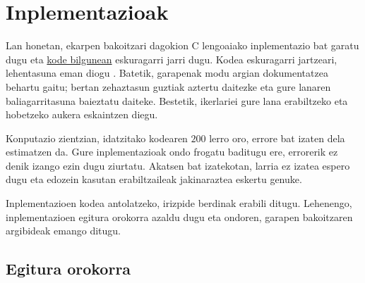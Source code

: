 \chapter{Inplementazioak}

Lan honetan, ekarpen bakoitzari dagokion C lengoaiako inplementazio bat garatu dugu eta \href{https://github.com/mikelehu/}{kode bilgunean} eskuragarri jarri dugu. Kodea eskuragarri jartzeari, lehentasuna eman diogu \cite{Atmanspacher2016,Wilson2014}. Batetik, garapenak modu argian dokumentatzea behartu gaitu; bertan zehaztasun guztiak aztertu daitezke eta gure lanaren baliagarritasuna baieztatu daiteke. Bestetik, ikerlariei gure lana erabiltzeko eta hobetzeko aukera eskaintzen diegu.

Konputazio zientzian, idatzitako kodearen $200$ lerro oro, errore bat izaten dela \cite{Frenkel2001} estimatzen da. Gure inplementazioak ondo frogatu baditugu ere, errorerik ez denik izango ezin dugu ziurtatu. Akatsen bat izatekotan, larria ez izatea espero dugu eta edozein kasutan  erabiltzaileak jakinaraztea eskertu genuke.   

Inplementazioen kodea antolatzeko, irizpide berdinak erabili ditugu. Lehenengo, inplementazioen egitura orokorra azaldu dugu eta ondoren, garapen bakoitzaren argibideak emango ditugu.      

\section{Egitura orokorra}

